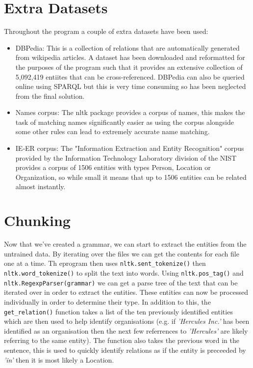 \documentclass[draft]{article}
\begin{document}
\begin{multicols*}{2}
\section{Extra Datasets}
Throughout the program a couple of extra datasets have been used:
\begin{itemize}
\item DBPedia: This is a collection of relations that are automatically generated from wikipedia articles. A dataset has been downloaded and reformatted for the purposes of the program such that it provides an extensive collection of 5,092,419 entiites that can be cross-referenced. DBPedia can also be queried online using SPARQL but this is very time consuming so has been neglected from the final solution.
\item Names corpus: The nltk package provides a corpus of names, this makes the task of matching names significantly easier as using the corpus alongside some other rules can lead to extremely accurate name matching.
\item IE-ER corpus: The "Information Extraction and Entity Recognition" corpus provided by the Information Technology Laboratory division of the NIST provides a corpus of 1506 entities with types Person, Location or Organization, so while small it means that up to 1506 entities can be related almost instantly.
\end{itemize}

\section{Chunking}
Now that we've created a grammar, we can start to extract the entities from the untrained data. By iterating over the files we can get the contents for each file one at a time. Th eprogram then uses \texttt{nltk.sent\_tokenize()} then \texttt{nltk.word\_tokenize()} to split the text into words. Using \texttt{nltk.pos\_tag()} and \texttt{nltk.RegexpParser(grammar)} we can get a parse tree of the text that can be iterated over in order to extract the entities. These entities can now be processed individually in order to determine their type. In addition to this, the \texttt{get\_relation()} function takes a list of the ten previously identified entities which are then used to help identify organisations (e.g. if \textit{'Hercules Inc.'} has been identified as an organisation then the next few referrences to \textit{'Hercules'} are likely referring to the same entity). The function also takes the previous word in the sentence, this is used to quickly identify relations as if the entity is preceeded by \textit{'in'} then it is most likely a Location.


\end{multicols*}
\end{document}
